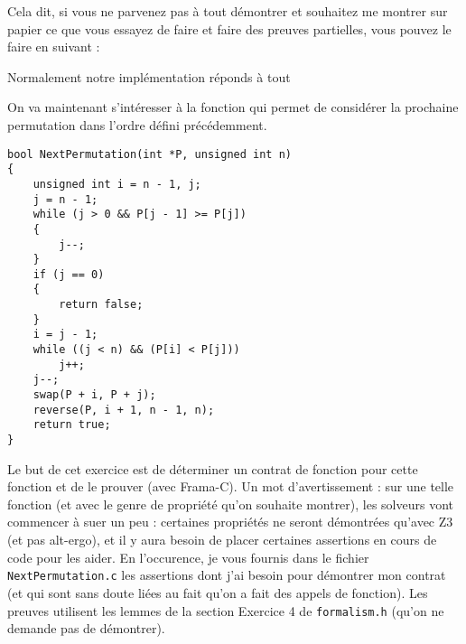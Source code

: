 \documentclass[11pt,answers]{exam}
\begin{document}
\begin{questions}
\begin{parts}
    Cela dit, si vous ne parvenez pas à tout démontrer et souhaitez me montrer sur papier ce que vous essayez de faire et faire des preuves partielles, vous pouvez le faire en suivant :

    \begin{solutionorbox}
        Normalement notre implémentation réponds à tout
    \end{solutionorbox}

    \end{parts}



    On va maintenant s’intéresser à la fonction qui permet de considérer la prochaine permutation dans l’ordre défini précédemment.

    \begin{lstlisting}
bool NextPermutation(int *P, unsigned int n)
{
    unsigned int i = n - 1, j;
    j = n - 1;
    while (j > 0 && P[j - 1] >= P[j])
    {
        j--;
    }
    if (j == 0)
    {
        return false;
    }
    i = j - 1;
    while ((j < n) && (P[i] < P[j]))
        j++;
    j--;
    swap(P + i, P + j);
    reverse(P, i + 1, n - 1, n);
    return true;
}
    \end{lstlisting}

    Le but de cet exercice est de déterminer un contrat de fonction pour cette fonction et de le prouver (avec Frama-C).
    Un mot d’avertissement : sur une telle fonction (et avec le genre de propriété qu’on souhaite montrer), les solveurs vont commencer à suer un peu : certaines propriétés ne seront démontrées qu’avec Z3 (et pas alt-ergo), et il y aura besoin de placer certaines assertions en cours de code pour les aider. En l’occurence, je vous fournis dans le fichier \texttt{NextPermutation.c} les assertions dont j’ai besoin pour démontrer mon contrat (et qui sont sans doute liées au fait qu’on a fait des appels de fonction).
    Les preuves utilisent les lemmes de la section Exercice 4 de \texttt{formalism.h} (qu’on ne demande pas de démontrer).

\end{questions}
\end{document}
